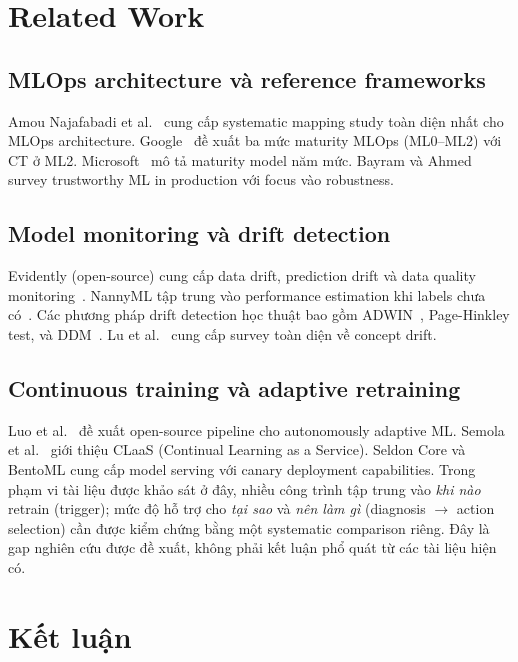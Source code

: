 \documentclass[11pt,a4paper]{article}
\begin{document}
\section{Related Work}

\subsection{MLOps architecture và reference frameworks}
Amou Najafabadi et al.~\cite{najafabadi2026} cung cấp systematic mapping study toàn diện nhất cho MLOps architecture. Google~\cite{google_mlops} đề xuất ba mức maturity MLOps (ML0--ML2) với CT ở ML2. Microsoft~\cite{microsoft_mlops} mô tả maturity model năm mức. Bayram và Ahmed~\cite{bayram2025} survey trustworthy ML in production với focus vào robustness.

\subsection{Model monitoring và drift detection}
Evidently (open-source) cung cấp data drift, prediction drift và data quality monitoring~\cite{evidently}. NannyML tập trung vào performance estimation khi labels chưa có~\cite{nannyml}. Các phương pháp drift detection học thuật bao gồm ADWIN~\cite{bifet2007}, Page-Hinkley test, và DDM~\cite{gama2004}. Lu et al.~\cite{lu2019} cung cấp survey toàn diện về concept drift.

\subsection{Continuous training và adaptive retraining}
Luo et al.~\cite{luo2023} đề xuất open-source pipeline cho autonomously adaptive ML. Semola et al.~\cite{semola2023} giới thiệu CLaaS (Continual Learning as a Service). Seldon Core và BentoML cung cấp model serving với canary deployment capabilities. Trong phạm vi tài liệu được khảo sát ở đây, nhiều công trình tập trung vào \emph{khi nào} retrain (trigger); mức độ hỗ trợ cho \emph{tại sao} và \emph{nên làm gì} (diagnosis $\rightarrow$ action selection) cần được kiểm chứng bằng một systematic comparison riêng. Đây là gap nghiên cứu được đề xuất, không phải kết luận phổ quát từ các tài liệu hiện có.

\section{Kết luận}
\end{document}
